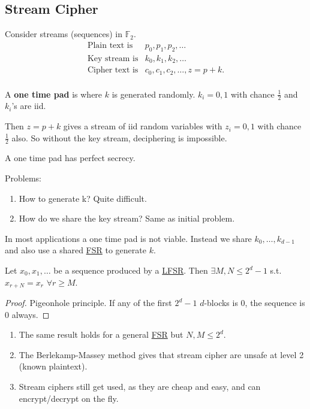 \documentclass{article}
\newcommand{\F}{\mathbb{F}}
\newcommand{\1}[1]{\mathbbm{1}_{#1}}
\begin{document}
\subsection{Stream Cipher}
Consider streams (sequences) in $\F_2$.
\begin{align*}
    \text{Plain text is} &p_0, p_1, p_2, \dotsc \\
    \text{Key stream is} &k_0, k_1, k_2, \dotsc \\
    \text{Cipher text is} &c_0, c_1, c_2, \dotsc, z=p+k. \\
\end{align*}

A \textbf{one time pad} is where $k$ is generated randomly.
$k_i = 0,1$ with chance $\frac{1}{2}$ and $k_i$'s are iid.

Then $z = p+k$ gives a stream of iid random variables with $z_i = 0,1$ with chance $\frac{1}{2}$ also.
So without the key stream, deciphering is impossible.

A one time pad has perfect secrecy.

Problems:
\begin{enumerate} [label=(\roman*)]
    \item How to generate k? Quite difficult.
    \item How do we share the key stream? Same as initial problem.
\end{enumerate}

In most applications a one time pad is not viable.
Instead we share $k_0, \dotsc, k_{d-1}$ and also use a shared \hyperlink{def:fsr}{FSR} to generate $k$.

\begin{nlemma}\label{lem:3.2}
    Let $x_0, x_1, \dotsc$ be a sequence produced by a \hyperlink{def:lfsr}{LFSR}. Then $\exists M,N \leq 2^d - 1$ s.t.\ $x_{r+N} = x_r$ $\forall r \geq M$.
\end{nlemma}
\begin{proof}
    Pigeonhole principle. If any of the first $2^d-1$ $d$-blocks is $0$, the sequence is 0 always.
\end{proof}
\begin{remark}
    \begin{enumerate} [label=(\roman*)]
        \item The same result holds for a general \hyperlink{def:fsr}{FSR} but $N,M \leq 2^d$.
        \item The Berlekamp-Massey method gives that stream cipher are unsafe at level 2 (known plaintext).
        \item Stream ciphers still get used, as they are cheap and easy, and can encrypt/decrypt on the fly.
    \end{enumerate}
\end{remark}
\end{document}
